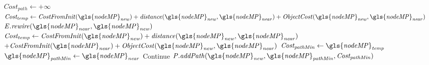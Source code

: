 \begin{algorithm}[H]
\begin{algorithmic}[1]
{{\hspace{-0.1cm}\colorbox{my_green}{\parbox{\linewidth}{%
    \State $\mathit{Cost_{path}} \leftarrow +\infty$ 
    \State $\mathit{Cost_{temp}} \leftarrow \mathit{CostFromInit(\gls{nodeMP}_{new}) + distance(\gls{nodeMP}_{new}, \gls{nodeMP}_{near}) + ObjectCost(\gls{nodeMP}_{new}, \gls{nodeMP}_{near})}$
    \State $\mathit{E.rewire(\gls{nodeMP}_{near}, \gls{nodeMP}_{new})}$
        \EndIf
      \Else {}
      \State $\mathit{Cost_{temp} \leftarrow CostFromInit(\gls{nodeMP}_{new}) + distance(\gls{nodeMP}_{new}, \gls{nodeMP}_{near})} $ \newline\hspace*{10em} $+ \mathit{CostFromInit(\gls{nodeMP}_{near}) + ObjectCost(\gls{nodeMP}_{new}, \gls{nodeMP}_{near})}$
          \State $\mathit{Cost_{pathMin} \leftarrow \gls{nodeMP}_{temp}}$
          \State $\mathit{\gls{nodeMP}_{pathMin} \leftarrow \gls{nodeMP}_{near}}$
          \EndIf
      \EndIf
          \State Continue
      \Else
      \State $\mathit{P.addPath(\gls{nodeMP}_{new}, \gls{nodeMP}_{pathMin}, Cost_{pathMin})}$
      \EndIf
    \EndFor
}}
\EndWhile
}}
\end{algorithmic}
\end{algorithm}

